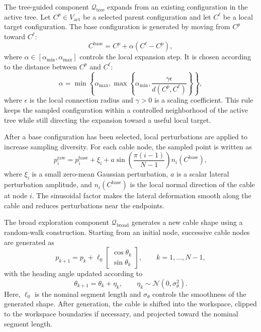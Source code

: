 \documentclass{pas}
\begin{document}
The tree-guided component \(\mathcal{Q}_{\mathrm{tree}}\) expands from an
existing configuration in the active tree. Let \(C^p\in V_{\mathrm{act}}\) be a
selected parent configuration and let \(C^{\ell}\) be a local target
configuration. The base configuration is generated by moving from \(C^p\) toward
\(C^{\ell}\):
\begin{equation}
C^{\mathrm{base}}
=
C^p
+
\alpha
\left(
C^{\ell}-C^p
\right),
\label{eq:tree_biased_base}
\end{equation}
where \(\alpha\in[\alpha_{\min},\alpha_{\max}]\) controls the local expansion
step. It is chosen according to the distance between \(C^p\) and \(C^{\ell}\):
\begin{equation}
\alpha
=
\min
\left\{
\alpha_{\max},
\max
\left\{
\alpha_{\min},
\frac{\gamma \epsilon}{d(C^p,C^{\ell})}
\right\}
\right\},
\label{eq:tree_biased_alpha}
\end{equation}
where \(\epsilon\) is the local connection radius and \(\gamma>0\) is a scaling
coefficient. This rule keeps the sampled configuration within a controlled
neighborhood of the active tree while still directing the expansion toward a
useful local target.

After a base configuration has been selected, local perturbations are applied to
increase sampling diversity. For each cable node, the sampled point is written as
\begin{equation}
p_i^{\mathrm{raw}}
=
p_i^{\mathrm{base}}
+
\xi_i
+
a
\sin
\left(
\frac{\pi(i-1)}{N-1}
\right)
n_i(C^{\mathrm{base}}),
\label{eq:raw_sample_noise}
\end{equation}
where \(\xi_i\) is a small zero-mean Gaussian perturbation, \(a\) is a scalar
lateral perturbation amplitude, and \(n_i(C^{\mathrm{base}})\) is the local
normal direction of the cable at node \(i\). The sinusoidal factor makes the
lateral deformation smooth along the cable and reduces perturbations near the
endpoints.

The broad exploration component \(\mathcal{Q}_{\mathrm{broad}}\) generates a
new cable shape using a random-walk construction. Starting from an initial node,
successive cable nodes are generated as
\begin{equation}
p_{k+1}
=
p_k
+
\ell_0
\begin{bmatrix}
\cos\theta_k\\
\sin\theta_k
\end{bmatrix},
\qquad
k=1,\ldots,N-1,
\label{eq:broad_random_walk_position}
\end{equation}
with the heading angle updated according to
\begin{equation}
\theta_{k+1}
=
\theta_k+\eta_k,
\qquad
\eta_k\sim\mathcal{N}(0,\sigma_\theta^2).
\label{eq:broad_random_walk_angle}
\end{equation}
Here, \(\ell_0\) is the nominal segment length and \(\sigma_\theta\) controls
the smoothness of the generated shape. After generation, the cable is shifted
into the workspace, clipped to the workspace boundaries if necessary, and
projected toward the nominal segment length.
\end{document}
